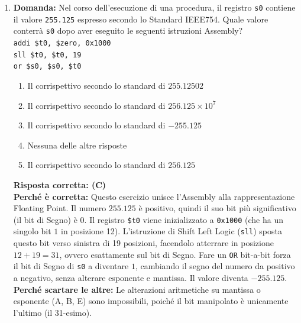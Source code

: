 \documentclass[12pt, a4paper]{article}
\begin{document}
\begin{enumerate}
    \item \textbf{Domanda:} Nel corso dell'esecuzione di una procedura, il registro \texttt{s0} contiene il valore \texttt{255.125} espresso secondo lo Standard IEEE754. Quale valore conterrà \texttt{s0} dopo aver eseguito le seguenti istruzioni Assembly? \\
    \texttt{addi \$t0, \$zero, 0x1000} \\
    \texttt{sll \$t0, \$t0, 19} \\
    \texttt{or \$s0, \$s0, \$t0}
    \begin{enumerate}[label=(\Alph*)]
        \item Il corrispettivo secondo lo standard di $255.12502$
        \item Il corrispettivo secondo lo standard di $256.125 \times 10^7$
        \item Il corrispettivo secondo lo standard di $-255.125$
        \item Nessuna delle altre risposte
        \item Il corrispettivo secondo lo standard di $256.125$
    \end{enumerate}

\newpage
    
    \textbf{Risposta corretta: (C)} \\
    \textbf{Perché è corretta:} Questo esercizio unisce l'Assembly alla rappresentazione Floating Point. Il numero $255.125$ è positivo, quindi il suo bit più significativo (il bit di Segno) è $0$. Il registro \texttt{\$t0} viene inizializzato a \texttt{0x1000} (che ha un singolo bit $1$ in posizione 12). L'istruzione di Shift Left Logic (\texttt{sll}) sposta questo bit verso sinistra di 19 posizioni, facendolo atterrare in posizione $12 + 19 = 31$, ovvero esattamente sul bit di Segno. Fare un \texttt{OR} bit-a-bit forza il bit di Segno di \texttt{s0} a diventare $1$, cambiando il segno del numero da positivo a negativo, senza alterare esponente e mantissa. Il valore diventa $-255.125$. \\
    \textbf{Perché scartare le altre:} Le alterazioni aritmetiche su mantissa o esponente (A, B, E) sono impossibili, poiché il bit manipolato è unicamente l'ultimo (il 31-esimo).



\end{enumerate}
\end{document}

